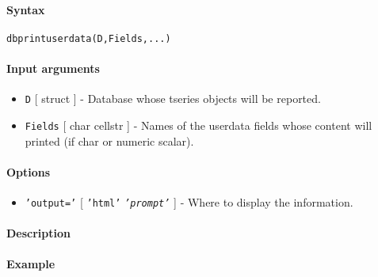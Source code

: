 


	\paragraph{Syntax}

\begin{verbatim}
dbprintuserdata(D,Fields,...)
\end{verbatim}

\paragraph{Input arguments}

\begin{itemize}
\item
  \texttt{D} {[} struct {]} - Database whose tseries objects will be
  reported.
\item
  \texttt{Fields} {[} char \textbar{} cellstr {]} - Names of the
  userdata fields whose content will printed (if char or numeric
  scalar).
\end{itemize}

\paragraph{Options}

\begin{itemize}
\itemsep1pt\parskip0pt
\item
  \texttt{'output='} {[} \texttt{'html'} \textbar{}
  \emph{\texttt{'prompt'}} {]} - Where to display the information.
\end{itemize}

\paragraph{Description}

\paragraph{Example}


